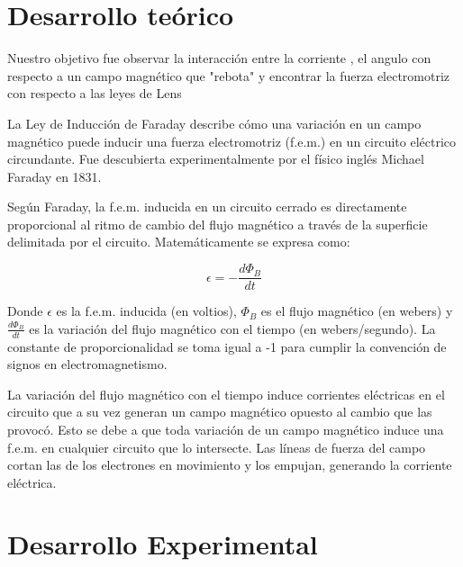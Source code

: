 \documentclass{article}
\begin{document}

\begin{multicols}{2}
\section{Desarrollo teórico}\label{Desarrollo Teorico}                              	%
Nuestro objetivo fue observar la interacción entre la corriente
, el angulo con respecto a un campo magnético que "rebota"
y encontrar la fuerza electromotriz con respecto a 
las leyes de Lens
\cite{Leskow}


La Ley de Inducción de Faraday describe cómo una variación en un campo magnético puede inducir una fuerza electromotriz (f.e.m.) en un circuito eléctrico circundante. Fue descubierta experimentalmente por el físico inglés Michael Faraday en 1831.


Según Faraday, la f.e.m. inducida en un circuito cerrado es directamente proporcional al ritmo de cambio del flujo magnético a través de la superficie delimitada por el circuito. Matemáticamente se expresa como:

\begin{equation}
\epsilon = - \frac{d\Phi_B}{dt}
\end{equation}

Donde $\epsilon$ es la f.e.m. inducida (en voltios), $\Phi_B$ es el flujo magnético (en webers) y $\frac{d\Phi_B}{dt}$ es la variación del flujo magnético con el tiempo (en webers/segundo). La constante de proporcionalidad se toma igual a -1 para cumplir la convención de signos en electromagnetismo.

La variación del flujo magnético con el tiempo induce corrientes eléctricas en el circuito que a su vez generan un campo magnético opuesto al cambio que las provocó. Esto se debe a que toda variación de un campo magnético induce una f.e.m. en cualquier circuito que lo intersecte. Las líneas de fuerza del campo cortan las de los electrones en movimiento y los empujan, generando la corriente eléctrica.



\section{Desarrollo Experimental}\label{Desarrollo experimental}				%

\end{multicols}
\end{document}
